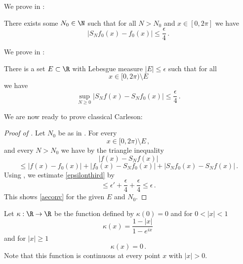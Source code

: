 We prove in :
\begin{lemma}
    \label{convergence-for-smooth}
    \leanok
    There exists some $N_0 \in \N$ such that for all $N>N_0$ and $x\in [0,2\pi]$ we have
    \begin{equation}
        |S_N f_0 (x)- f_0(x)|\le \frac \epsilon 4\, .
    \end{equation}
\end{lemma}

We prove in :
\begin{lemma}
    \label{control-approximation-effect}
    \leanok
    There is a set $E \subset \R$ with Lebesgue measure
    $|E|\le \epsilon$ such that for all
    \begin{equation}
        x\in [0,2\pi)\setminus E
    \end{equation}
   we have
   \begin{equation}
    \label{eq-max-partial-sum-diff}
    \sup_{N\ge 0} |S_Nf(x)-S_Nf_0(x)| \le \frac \epsilon 4\,.
    \end{equation}
\end{lemma}

We are now ready to prove classical Carleson:
\begin{proof} [Proof of ]
\leanok
Let $N_0$ be as in .
For every
\begin{equation}
x\in [0, 2\pi) \setminus E\, ,
\end{equation}
and every $N>N_0$ we have by the triangle inequality
\begin{equation*}
    |f(x)-S_Nf(x)|
    \end{equation*}
    \begin{equation}\label{epsilonthird}
    \le |f(x)-f_0(x)|+ |f_0(x)-S_Nf_0(x)|+|S_Nf_0(x)-S_N f(x)|\, .
\end{equation}
Using , we estimate \eqref{epsilonthird} by
\begin{equation}
    \le \epsilon' +\frac \epsilon 4 +\frac \epsilon 4\le \epsilon\, .
\end{equation}
This shows \eqref{aeconv} for the given $E$ and $N_0$.
\end{proof}

Let $\kappa:\R\to \R$ be the function defined by
$\kappa(0)=0$ and for $0<|x|<1$
\begin{equation}\label{eq-hilker}
\kappa(x)=\frac { 1-|x|}{1-e^{ix}}\,
\end{equation}
and for $|x|\ge 1$
\begin{equation}\label{eq-hilker1}
\kappa(x)=0\, .
\end{equation}
Note that this function is continuous at every point $x$ with $|x|>0$.

